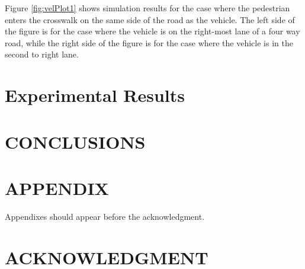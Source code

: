 \documentclass[letterpaper, 10 pt, conference]{ieeeconf}  %
\begin{document}
Figure \ref{fig:velPlot1} shows simulation results for the case where the pedestrian enters the crosswalk on the same side of the road as the vehicle. The left side of the figure is for the case where the vehicle is on the right-most lane of a four way road, while the right side of the figure is for the case where the vehicle is in the second to right lane. 


\section{Experimental Results}
\label{sec:expres}






\section{CONCLUSIONS}


\addtolength{\textheight}{-12cm}   %







\section*{APPENDIX}

Appendixes should appear before the acknowledgment.

\section*{ACKNOWLEDGMENT}










\end{document}
